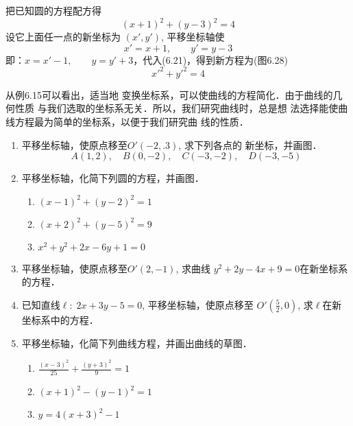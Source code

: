 \begin{solution}
    把已知圆的方程配方得
\begin{equation}
    (x+1)^2+(y-3)^2=4
\end{equation}
设它上面任一点的新坐标为
$(x',y')$, 平移坐标轴使
\[x'=x+1,\qquad y'=y-3\]
即：$x=x'-1,\qquad y=y'+3$，代入(6.21)，得到新方程为(图6.28)
\[{x'}^2+{y'}^2=4\]
\end{solution}

\begin{figure}[htp]
    \centering
{}
    \caption{}
\end{figure}


从例6.15可以看出，适当地
变换坐标系，可以使曲线的方程简化．由于曲线的几何性质
与我们选取的坐标系无关．所以，我们研究曲线时，总是想
法选择能使曲线方程最为简单的坐标系，以便于我们研究曲
线的性质．

\begin{ex}
\begin{enumerate}
    \item 平移坐标轴，使原点移至$O'(-2,.3)$, 求下列各点的
    新坐标，并画图．
\[    A(1,2),\quad B(0,-2),\quad  C(-3,-2),\quad D(-3,-5)\]
    \item 平移坐标轴，化简下列圆的方程，并画图．
\begin{enumerate}
    \item $(x-1)^2+(y-2)^2=1$
    \item $(x+2)^2+(y-5)^2=9$
    \item $x^2+y^2+2x-6y+1=0$
\end{enumerate}

    \item 平移坐标轴，使原点移至$O'(2,-1)$, 求曲线
    $y^2+2y-4x+9=0$在新坐标系的方程．
    \item 已知直线$\ell:\; 2x+3y-5=0$, 平移坐标轴，使原点移至
    $O'\left(\frac{5}{2},0\right)$, 
求$\ell$在新坐标系中的方程．
\item 平移坐标轴，化简下列曲线方程，并画出曲线的草图．
\begin{enumerate}
    \item $\frac{(x-3)^2}{25}+\frac{(y+3)^2}{9}=1$
    \item $(x+1)^2-(y-1)^2=1$
    \item $y=4(x+3)^2-1$
\end{enumerate}
\end{enumerate}
\end{ex}

